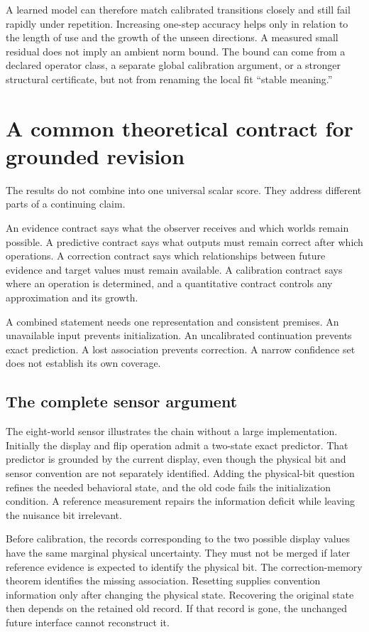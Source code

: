 \documentclass[11pt,letterpaper]{article}
\theoremstyle{plain}
\theoremstyle{definition}
\begin{document}
A learned model can therefore match calibrated transitions closely and still fail rapidly under repetition. Increasing one-step accuracy helps only in relation to the length of use and the growth of the unseen directions. A measured small residual does not imply an ambient norm bound. The bound can come from a declared operator class, a separate global calibration argument, or a stronger structural certificate, but not from renaming the local fit ``stable meaning.''

\section{A common theoretical contract for grounded revision}\label{sec:integration}
The results do not combine into one universal scalar score. They address different parts of a continuing claim.

An evidence contract says what the observer receives and which worlds remain possible. A predictive contract says what outputs must remain correct after which operations. A correction contract says which relationships between future evidence and target values must remain available. A calibration contract says where an operation is determined, and a quantitative contract controls any approximation and its growth.

A combined statement needs one representation and consistent premises. An unavailable input prevents initialization. An uncalibrated continuation prevents exact prediction. A lost association prevents correction. A narrow confidence set does not establish its own coverage.

\subsection{The complete sensor argument}
The eight-world sensor illustrates the chain without a large implementation. Initially the display and flip operation admit a two-state exact predictor. That predictor is grounded by the current display, even though the physical bit and sensor convention are not separately identified. Adding the physical-bit question refines the needed behavioral state, and the old code fails the initialization condition. A reference measurement repairs the information deficit while leaving the nuisance bit irrelevant.

Before calibration, the records corresponding to the two possible display values have the same marginal physical uncertainty. They must not be merged if later reference evidence is expected to identify the physical bit. The correction-memory theorem identifies the missing association. Resetting supplies convention information only after changing the physical state. Recovering the original state then depends on the retained old record. If that record is gone, the unchanged future interface cannot reconstruct it.
\end{document}

